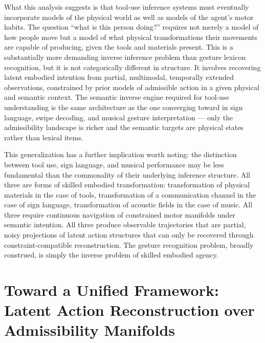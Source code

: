 \documentclass[11pt, a4paper]{article}
\theoremstyle{definition}
\begin{document}
What this analysis suggests is that tool-use inference systems must eventually incorporate models of the physical world as well as models of the agent's motor habits. The question ``what is this person doing?'' requires not merely a model of how people move but a model of what physical transformations their movements are capable of producing, given the tools and materials present. This is a substantially more demanding inverse inference problem than gesture lexicon recognition, but it is not categorically different in structure. It involves recovering latent embodied intention from partial, multimodal, temporally extended observations, constrained by prior models of admissible action in a given physical and semantic context. The semantic inverse engine required for tool-use understanding is the same architecture as the one converging toward in sign language, swipe decoding, and musical gesture interpretation --- only the admissibility landscape is richer and the semantic targets are physical states rather than lexical items.

This generalization has a further implication worth noting: the distinction between tool use, sign language, and musical performance may be less fundamental than the commonality of their underlying inference structure. All three are forms of skilled embodied transformation: transformation of physical materials in the case of tools, transformation of a communication channel in the case of sign language, transformation of acoustic fields in the case of music. All three require continuous navigation of constrained motor manifolds under semantic intention. All three produce observable trajectories that are partial, noisy projections of latent action structures that can only be recovered through constraint-compatible reconstruction. The gesture recognition problem, broadly construed, is simply the inverse problem of skilled embodied agency.

\section{Toward a Unified Framework: Latent Action Reconstruction over Admissibility Manifolds}
\end{document}
